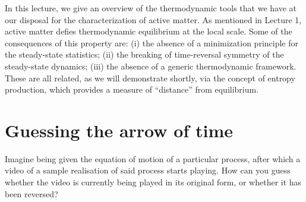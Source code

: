 In this lecture, we give an overview of the thermodynamic tools that we have at our disposal for the characterization of active matter. 
As mentioned in Lecture 1, active matter defies thermodynamic equilibrium at the local scale. Some of the consequences of this property are: (i) the absence of a minimization principle for the steady-state statistics; (ii) the breaking of time-reversal symmetry of the steady-state dynamics; (iii) the absence of a generic thermodynamic framework. These are all related, as we will demonstrate shortly, via the concept of entropy production, which provides a measure of ``distance'' from equilibrium.


\section{Guessing the arrow of time}

Imagine being given the equation of motion of a particular process, after which a video of a sample realisation of said process starts playing. How can you guess whether the video is currently being played in its original form, or whether it has been reversed?

